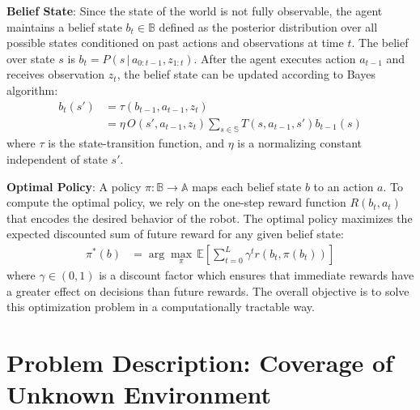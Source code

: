 \documentclass{article}
\newcommand{\ph}[1]{{\textbf{#1}:}} %
\begin{document}
\ph{Belief State} Since the state of the world is not fully observable, the agent maintains a belief state $b_t\in \mathbb{B}$ defined as the posterior distribution over all possible states conditioned on past actions and observations at time $t$. The belief over state $s$ is $b_{t} = P(s \,|\, a_{0:t-1}, z_{1:t})$. After the agent executes action $a_{t-1}$ and receives observation $z_t$, the belief state can be updated according to Bayes algorithm:
\begin{align}
  b_t(s') &= \tau (b_{t-1}, a_{t-1}, z_t) \\
  &= \eta \, O(s', a_{t-1}, z_t) \sum_{s \in \mathbb{S}} T(s, a_{t-1}, s') b_{t-1}(s)
  \label{eq:belief_update}
\end{align}
where $\tau$ is the state-transition function, and $\eta$ is a normalizing constant independent of state $s'$. 


\ph{Optimal Policy} A policy $\pi : \mathbb{B} \rightarrow \mathbb{A}$ maps each belief state $b$ to an action $a$. To compute the optimal policy, we rely on the one-step reward function $R(b_t, a_t)$ that encodes the desired behavior of the robot. The optimal policy maximizes the expected discounted sum of future reward for any given belief state:
\begin{align}
  \pi^*(b) &= \arg\max_\pi \, \mathbb{E} \left[ \sum_{t=0}^{L} \gamma^t r(b_t, \pi(b_t)) \right]
  \label{eq:optimal_policy}
\end{align}
where $\gamma \in (0,1)$ is a discount factor which ensures that immediate rewards have a greater effect on decisions than future rewards. The overall objective is to solve this optimization problem in a computationally tractable way.





\section{Problem Description: Coverage of Unknown Environment}
\end{document}
